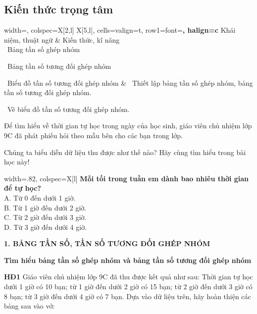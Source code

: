 \begin{lesson}
    \subsection{Kiến thức trọng tâm}

    \begin{center}
        \begin{tblr}{
            width=\linewidth,
            colspec={X[2,l] X[5,l]},
            cells={valign=t},
            row{1}={font=\bfseries, halign=c}
        }
            Khái niệm, thuật ngữ &
            Kiến thức, kĩ năng \\
            \textbullet\ Bảng tần số ghép nhóm\par
            \textbullet\ Bảng tần số tương đối ghép nhóm\par
            \textbullet\ Biểu đồ tần số tương đối ghép nhóm
            &
            \textbullet\ Thiết lập bảng tần số ghép nhóm, bảng tần số tương đối ghép nhóm.\par
            \textbullet\ Vẽ biểu đồ tần số tương đối ghép nhóm.
        \end{tblr}
    \end{center}

    Để tìm hiểu về thời gian tự học trong ngày của học sinh, giáo viên chủ nhiệm lớp 9C đã phát phiếu hỏi theo mẫu bên cho các bạn trong lớp.

    Chúng ta biểu diễn dữ liệu thu được như thế nào? Hãy cùng tìm hiểu trong bài học này!

    \begin{center}
        \begin{tblr}{
            width=.82\linewidth,
            colspec={X[l]}
        }
            \textbf{Mỗi tối trong tuần em dành bao nhiêu thời gian để tự học?} \\
            A. Từ 0 đến dưới 1 giờ. \\
            B. Từ 1 giờ đến dưới 2 giờ. \\
            C. Từ 2 giờ đến dưới 3 giờ. \\
            D. Từ 3 giờ đến dưới 4 giờ.
        \end{tblr}
    \end{center}

    \textbf{1. BẢNG TẦN SỐ, TẦN SỐ TƯƠNG ĐỐI GHÉP NHÓM}

    \textbf{Tìm hiểu bảng tần số ghép nhóm và bảng tần số tương đối ghép nhóm}

    \textbf{HĐ1} Giáo viên chủ nhiệm lớp 9C đã thu được kết quả như sau: Thời gian tự học dưới 1 giờ có 10 bạn; từ 1 giờ đến dưới 2 giờ có 15 bạn; từ 2 giờ đến dưới 3 giờ có 8 bạn; từ 3 giờ đến dưới 4 giờ có 7 bạn. Dựa vào dữ liệu trên, hãy hoàn thiện các bảng sau vào vở:


\end{lesson}
